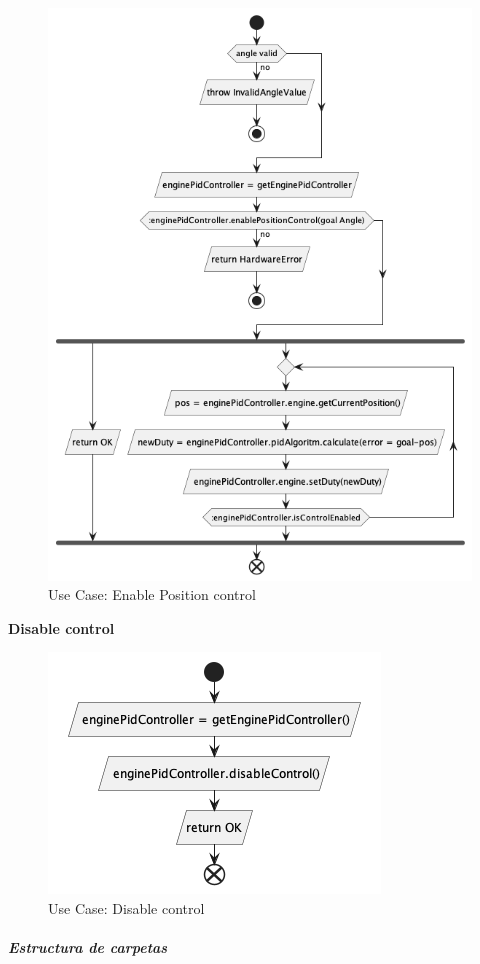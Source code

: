 \begin{figure}[H]
    \centering
    \includegraphics[height=0.4\textheight]{./part/Proyecto_ejecutivo/memoria_descriptiva/descripcionDelProyecto/control/uml/enablePositionControl}
    \caption{Use Case: Enable Position control}\label{fig:Use Case- Enable Position control}
\end{figure}

\textbf{Disable control}

\begin{figure}[H]
    \centering
    \includegraphics[height=0.2\textheight]{./part/Proyecto_ejecutivo/memoria_descriptiva/descripcionDelProyecto/control/uml/disableControl}
    \caption{Use Case: Disable control}\label{fig:Use Case- Disable control}
\end{figure}

\newpage
\subparagraph{Estructura de carpetas}







